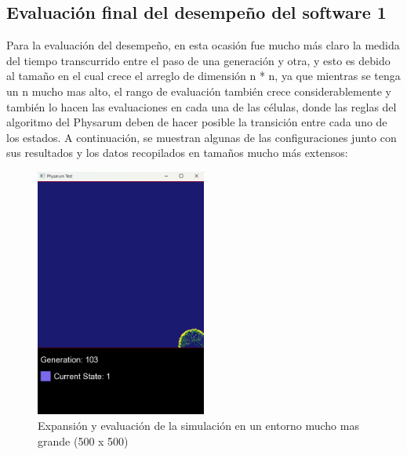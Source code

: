 \subsection{Evaluaci\'on final del desempe\~no del software 1}
    Para la evaluaci\'on del desempe\~no, en esta ocasi\'on fue
        mucho m\'as claro la medida del tiempo transcurrido entre el
        paso de una generaci\'on y otra, y esto es debido al tama\~no en
        el cual crece el arreglo de dimensi\'on n * n, ya que mientras
        se tenga un n mucho mas alto, el rango de evaluaci\'on
        tambi\'en crece considerablemente y tambi\'en lo hacen las
        evaluaciones en cada una de las c\'elulas, donde las reglas del
        algoritmo del Physarum deben de hacer posible la transici\'on
        entre cada uno de los estados.
    \vskip 0.5cm
    A continuaci\'on, se muestran algunas de las configuraciones
    junto con sus resultados y los datos recopilados en tama\~nos
    mucho m\'as extensos:
    \vskip 0.5cm
    \begin{figure}[htbp]
        \centering
        \includegraphics[width=0.5\textwidth]{./images/Pruebas/simulador/image079.png}
        \caption{Expansi\'on y evaluaci\'on de la simulaci\'on en un entorno mucho mas grande (500 x 500)}
        \label{fig:Ruta 79}
    \end{figure}
    \vskip 0.5cm
